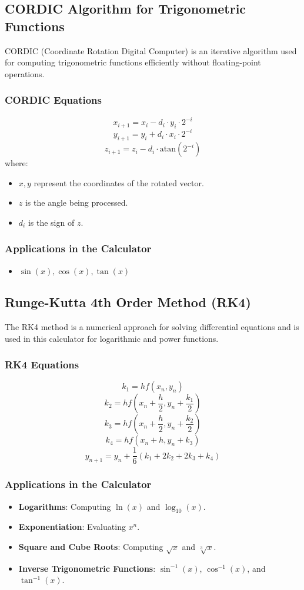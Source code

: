 \documentclass[a4paper,12pt]{article}
\begin{document}
\subsection{CORDIC Algorithm for Trigonometric Functions}
CORDIC (Coordinate Rotation Digital Computer) is an iterative algorithm used for computing trigonometric functions efficiently without floating-point operations.

\subsubsection{CORDIC Equations}
\[
x_{i+1} = x_i - d_i \cdot y_i \cdot 2^{-i}
\]
\[
y_{i+1} = y_i + d_i \cdot x_i \cdot 2^{-i}
\]
\[
z_{i+1} = z_i - d_i \cdot \text{atan}(2^{-i})
\]
where:
\begin{itemize}
    \item \( x, y \) represent the coordinates of the rotated vector.
    \item \( z \) is the angle being processed.
    \item \( d_i \) is the sign of \( z \).
\end{itemize}
\subsubsection{Applications in the Calculator}
\begin{itemize}
    \item $\sin(x) , \cos(x), \tan(x)$
\end{itemize}
\subsection{Runge-Kutta 4th Order Method (RK4)}
The RK4 method is a numerical approach for solving differential equations and is used in this calculator for logarithmic and power functions.

\subsubsection{RK4 Equations}
\[
k_1 = h f(x_n, y_n)
\]
\[
k_2 = h f(x_n + \frac{h}{2}, y_n + \frac{k_1}{2})
\]
\[
k_3 = h f(x_n + \frac{h}{2}, y_n + \frac{k_2}{2})
\]
\[
k_4 = h f(x_n + h, y_n + k_3)
\]
\[
y_{n+1} = y_n + \frac{1}{6} (k_1 + 2k_2 + 2k_3 + k_4)
\]

\subsubsection{Applications in the Calculator}
\begin{itemize}
    \item \textbf{Logarithms}: Computing \( \ln(x) \) and \( \log_{10}(x) \).
    \item \textbf{Exponentiation}: Evaluating \( x^n \).
    \item \textbf{Square and Cube Roots}: Computing \( \sqrt{x} \) and \( \sqrt[3]{x} \).
    \item \textbf{Inverse Trigonometric Functions}: \( \sin^{-1}(x) \), \( \cos^{-1}(x) \), and \( \tan^{-1}(x) \).
\end{itemize}
\end{document}
